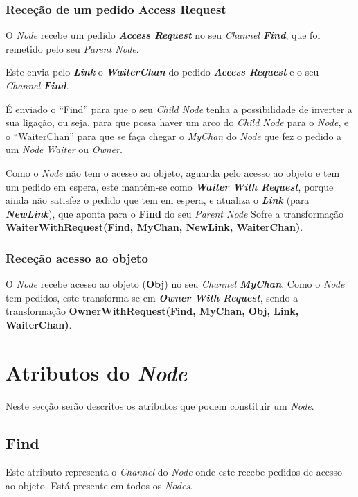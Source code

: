 \subsubsection*{Receção de um pedido Access Request}
O \emph{Node} recebe um pedido \emph{\textbf{Access Request}} no seu \emph{Channel \textbf{Find}}, que foi remetido pelo seu \emph{Parent Node}.

Este envia pelo \textbf{\emph{Link}} o \textbf{\emph{WaiterChan}} do pedido \emph{\textbf{Access Request}} e o seu \emph{Channel \textbf{Find}}.

É enviado o ``Find'' para que o seu \emph{Child Node} tenha a possibilidade de inverter a sua ligação, ou seja, para que possa haver um arco do \emph{Child Node} para o \emph{Node}, 
e o ``WaiterChan'' para que se faça chegar o \emph{MyChan} do \emph{Node} que fez o pedido a um \emph{Node} \emph{Waiter} ou \emph{Owner}.

Como o \emph{Node} não tem o acesso ao objeto, aguarda pelo acesso ao objeto e tem um pedido em espera, este mantém-se como \emph{\textbf{Waiter With Request}},
porque ainda não satisfez o pedido que tem em espera, 
e atualiza o \textbf{\emph{Link}} (para \textbf{\emph{NewLink}}), que aponta para o \textbf{Find} do seu \emph{Parent Node}
Sofre a transformação \textbf{WaiterWithRequest(Find, MyChan, \underline{NewLink}, WaiterChan)}.


\subsubsection*{Receção acesso ao objeto}
O \emph{Node} recebe acesso ao objeto (\textbf{Obj}) no seu \emph{Channel \textbf{MyChan}}.
Como o \emph{Node} tem pedidos, este transforma-se em \textbf{\emph{Owner With Request}}, sendo a transformação \textbf{OwnerWithRequest(Find, MyChan, Obj, Link, WaiterChan)}.



\section{Atributos do \emph{Node}}
\label{especificacao:atr:section}
Neste secção serão descritos os atributos que podem constituir um \emph{Node}.

\subsection*{Find}
\label{especificacao:atr:Find}
    Este atributo representa o \emph{Channel} do \emph{Node} onde este recebe pedidos de acesso ao objeto.
    Está presente em todos os \emph{Nodes}.

